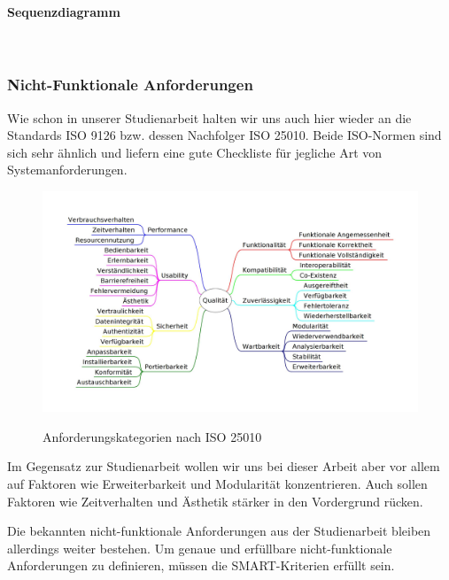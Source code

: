 \paragraph{Sequenzdiagramm}~\\

\subsubsection{Nicht-Funktionale Anforderungen}
Wie schon in unserer Studienarbeit halten wir uns auch hier wieder an die Standards ISO 9126\cite{ISO9126} bzw. dessen Nachfolger ISO 25010\cite{ISO9126_ISO25010}. Beide ISO-Normen sind sich sehr ähnlich und liefern eine gute Checkliste für jegliche Art von Systemanforderungen.

\begin{figure}[h]
	\centering
	\includegraphics[width=1\linewidth]{img/anforderungen/quality}
	\caption[Anforderungskategorien nach ISO 25010]{Anforderungskategorien nach  ISO 25010}\cite{ISO25010_Bild}
	\label{fig:ISO 25010}
\end{figure}

Im Gegensatz zur Studienarbeit wollen wir uns bei dieser Arbeit aber vor allem auf Faktoren wie Erweiterbarkeit und Modularität konzentrieren. Auch sollen Faktoren wie Zeitverhalten und Ästhetik stärker in den Vordergrund rücken. 

Die bekannten nicht-funktionale Anforderungen aus der Studienarbeit bleiben allerdings weiter bestehen. Um genaue und erfüllbare nicht-funktionale Anforderungen zu definieren, müssen die SMART-Kriterien \cite{SMART} erfüllt sein.

